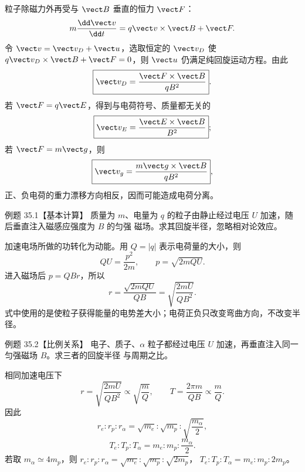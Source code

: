 粒子除磁力外再受与 $\vect B$ 垂直的恒力 $\vect F$：
\begin{equation}
  m\frac{\dd\vect v}{\dd t}=q\vect v\times\vect B+\vect F.
\end{equation}
令 $\vect v=\vect v_D+\vect u$，选取恒定的 $\vect v_D$ 使
$q\vect v_D\times\vect B+\vect F=0$，则 $\vect u$ 仍满足纯回旋运动方程。由此
\begin{equation}
  \boxed{\vect v_D=\frac{\vect F\times\vect B}{qB^2}}.
\end{equation}
若 $\vect F=q\vect E$，得到与电荷符号、质量都无关的
\begin{equation}
  \boxed{\vect v_E=\frac{\vect E\times\vect B}{B^2}};
\end{equation}
若 $\vect F=m\vect g$，则
\begin{equation}
  \boxed{\vect v_g=\frac{m\vect g\times\vect B}{qB^2}},
\end{equation}
正、负电荷的重力漂移方向相反，因而可能造成电荷分离。

\driftDiagram




\Needspace{0.31\textheight}
\begin{origexamplebox}{例题 35.1【基本计算】}
质量为 $m$、电量为 $q$ 的粒子由静止经过电压 $U$ 加速，随后垂直注入磁感应强度为 $B$ 的匀强
磁场。求其回旋半径，忽略相对论效应。
\end{origexamplebox}

\begin{xesolution}
加速电场所做的功转化为动能。用 $Q=|q|$ 表示电荷量的大小，则
\[
  QU=\frac{p^2}{2m},
  \qquad p=\sqrt{2mQU}.
\]
进入磁场后 $p=QBr$，所以
\begin{equation}
  \boxed{r=\frac{\sqrt{2mQU}}{QB}
  =\sqrt{\frac{2mU}{QB^2}}}.
\end{equation}
式中使用的是使粒子获得能量的电势差大小；电荷正负只改变弯曲方向，不改变半径。
\end{xesolution}

\Needspace{0.30\textheight}
\begin{origexamplebox}{例题 35.2【比例关系】}
电子、质子、$\alpha$ 粒子都经过电压 $U$ 加速，再垂直注入同一匀强磁场 $B$。求三者的回旋半径
与周期之比。
\end{origexamplebox}

\begin{xesolution}
相同加速电压下
\[
  r=\sqrt{\frac{2mU}{QB^2}}\propto\sqrt{\frac mQ},
  \qquad T=\frac{2\pi m}{QB}\propto\frac mQ.
\]
因此
\begin{equation}
  \boxed{r_e:r_p:r_\alpha
  =\sqrt{m_e}:\sqrt{m_p}:\sqrt{\frac{m_\alpha}{2}}},
\end{equation}
\begin{equation}
  \boxed{T_e:T_p:T_\alpha=m_e:m_p:\frac{m_\alpha}{2}}.
\end{equation}
若取 $m_\alpha\simeq4m_p$，则
$r_e:r_p:r_\alpha=\sqrt{m_e}:\sqrt{m_p}:\sqrt{2m_p}$，
$T_e:T_p:T_\alpha=m_e:m_p:2m_p$。
\end{xesolution}

